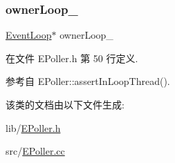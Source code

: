 \mbox{\label{classmuduo_1_1EPoller_ab7cf856df3fd0f8496fcf3b59b8a24ab}} 
\subsubsection{\texorpdfstring{owner\+Loop\+\_\+}{ownerLoop\_}}
{\footnotesize\ttfamily \hyperlink{classmuduo_1_1EventLoop}{Event\+Loop}$\ast$ owner\+Loop\+\_\+\hspace{0.3cm}{\ttfamily [private]}}



在文件 E\+Poller.\+h 第 50 行定义.



参考自 E\+Poller\+::assert\+In\+Loop\+Thread().



该类的文档由以下文件生成\+:\begin{DoxyCompactItemize}
\item 
lib/\hyperlink{EPoller_8h}{E\+Poller.\+h}\item 
src/\hyperlink{EPoller_8cc}{E\+Poller.\+cc}\end{DoxyCompactItemize}
